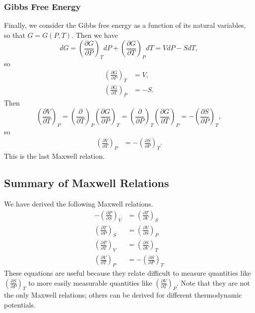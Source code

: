 \subsubsection{Gibbs Free Energy}
Finally, we consider the Gibbs free energy as a function of its natural variables, so that $G = G(P,T)$. Then we have 
$$dG = \left(\frac{\partial G}{\partial P} \right)_T dP + \left(\frac{\partial G}{\partial T} \right)_P dT = V dP - S dT,$$
so 
\begin{align*}
 \left(\frac{\partial G}{\partial P} \right)_T &= V, \\
  \left(\frac{\partial G}{\partial T} \right)_P &= -S.
\end{align*}
Then 
$$ \left(\frac{\partial V}{\partial T} \right)_P =
 \left(\frac{\partial }{\partial T} \right)_P\left(\frac{\partial G}{\partial P} \right)_T  = \left(\frac{\partial }{\partial P} \right)_T \left(\frac{\partial G}{\partial T} \right)_P = -\left(\frac{\partial S}{\partial P} \right)_T,
$$ so 
\begin{align}
 \left(\frac{\partial V }{\partial T} \right)_P &= -\left(\frac{\partial S }{\partial P} \right)_T \label{eq:m4}.
\end{align}
This is the last Maxwell relation.
\subsection{Summary of Maxwell Relations}
We have derived the following Maxwell relations.
\begin{align*}
 -\left(\frac{\partial P }{\partial S} \right)_V &= \left(\frac{\partial T}{\partial V} \right)_S\\
\left(\frac{\partial T }{\partial P} \right)_S &= \left(\frac{\partial V }{\partial S} \right)_P\\
 \left(\frac{\partial P }{\partial T} \right)_V &= \left(\frac{\partial S }{\partial V} \right)_T\\
\left(\frac{\partial V }{\partial T} \right)_P &= -\left(\frac{\partial S }{\partial P} \right)_T
\end{align*}
These equations are useful because they relate difficult to measure quantities like $\left(\frac{\partial S }{\partial P} \right)_T$ to more easily measurable quantities like $\left(\frac{\partial V }{\partial T} \right)_P$. Note that they are not the only Maxwell relations; others can be derived for different thermodynamic potentials. 